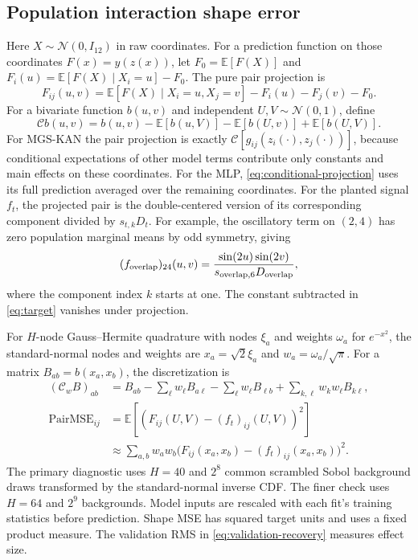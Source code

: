 \documentclass[11pt]{article}
\let\StudyMathSubsection\subsection
\newcommand{\E}{\mathbb{E}}
\newcommand{\N}{\mathcal{N}}
\begin{document}
\StudyMathSubsection{Population interaction shape error}

Here \(X\sim\N(0,I_{12})\) in raw coordinates. For a prediction function on
those coordinates \(F(x)=\widehat y(z(x))\), let
\(F_0=\E[F(X)]\) and \(F_i(u)=\E[F(X)\mid X_i=u]-F_0\).
The pure pair projection is
\begin{equation}
 F_{ij}(u,v)=\E[F(X)\mid X_i=u,X_j=v]-F_i(u)-F_j(v)-F_0 .
 \label{eq:conditional-projection}
\end{equation}
For a bivariate function \(b(u,v)\) and independent \(U,V\sim\N(0,1)\),
define
\[
 \mathcal C b(u,v)= b(u,v)-\E[b(u,V)]-\E[b(U,v)]+\E[b(U,V)] .
\]
For MGS-KAN the pair projection is exactly
\(\mathcal C[g_{ij}(z_i(\cdot),z_j(\cdot))]\), because conditional
expectations of other model terms contribute only constants and main
effects on these coordinates. For the MLP, \eqref{eq:conditional-projection}
uses its full prediction averaged over the remaining coordinates.
For the planted signal \(f_t\), the projected pair is the double-centered
version of its corresponding component divided by \(s_{t,k}D_t\).
For example, the oscillatory term on \((2,4)\) has zero population
marginal means by odd symmetry, giving
\[
 (f_{\rm overlap})_{24}(u,v)
   =\frac{\sin(2u)\sin(2v)}{s_{{\rm overlap},6}D_{\rm overlap}},
\]
where the component index \(k\) starts at one.
The constant subtracted in \eqref{eq:target} vanishes under projection.

For \(H\)-node Gauss--Hermite quadrature with nodes \(\xi_a\) and
weights \(\omega_a\) for \(e^{-x^2}\), the standard-normal nodes and
weights are \(x_a=\sqrt{2}\xi_a\) and \(w_a=\omega_a/\sqrt{\pi}\).
For a matrix \(B_{ab}=b(x_a,x_b)\), the discretization is
\begin{align}
 (\mathcal C_wB)_{ab}
   &=B_{ab}-\sum_\ell w_\ell B_{a\ell}
           -\sum_\ell w_\ell B_{\ell b}
           +\sum_{k,\ell}w_kw_\ell B_{k\ell},\nonumber\\
 \operatorname{PairMSE}_{ij}
   &=\E[(F_{ij}(U,V)-(f_t)_{ij}(U,V))^2]\nonumber\\
   &\approx \sum_{a,b}w_aw_b
      \bigl(F_{ij}(x_a,x_b)-(f_t)_{ij}(x_a,x_b)\bigr)^2 .
 \label{eq:pair-mse}
\end{align}
The primary diagnostic uses \(H=40\) and \(2^8\) common scrambled Sobol
background draws transformed by the standard-normal inverse CDF. The
finer check uses \(H=64\) and \(2^9\) backgrounds. Model inputs are
rescaled with each fit's training statistics before prediction. Shape
MSE has squared target units and uses a fixed product measure. The
validation RMS in \eqref{eq:validation-recovery} measures effect size.
\end{document}
